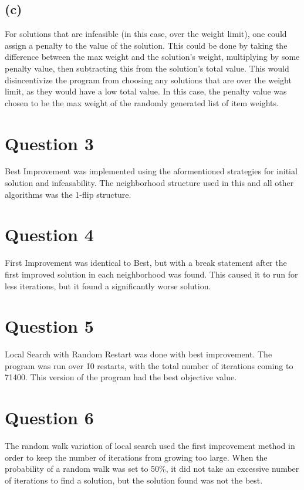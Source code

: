 \documentclass[12pt, letterpaper]{article}
\begin{document}
\subsection*{(c)}
For solutions that are infeasible (in this case, over the weight limit), one could assign a penalty to the value of the solution. This could be done by taking the difference between the max weight and the solution's weight, multiplying by some penalty value, then subtracting this from the solution's total value. This would disincentivize the program from choosing any solutions that are over the weight limit, as they would have a low total value. In this case, the penalty value was  chosen to be the max weight of the randomly generated list of item weights. 


\section*{Question 3}

Best Improvement was implemented using the aformentioned strategies for initial solution and infeasability. The neighborhood structure used in this and all other algorithms was the 1-flip structure. 

\section*{Question 4}

First Improvement was identical to Best, but with a break statement after the first improved solution in each neighborhood was found. This caused it to run for less iterations, but it found a significantly worse solution.
\section*{Question 5}

Local Search with Random Restart was done with best improvement. The program was run over 10 restarts, with the total number of iterations coming to 71400. This version of the program had the best objective value.

\section*{Question 6}

The random walk variation of local search used the first improvement method in order to keep the number of iterations from growing too large. When the probability of a random walk was set to 50\%, it did not take an excessive number of iterations to find a solution, but the solution found was not the best. 
\end{document}
